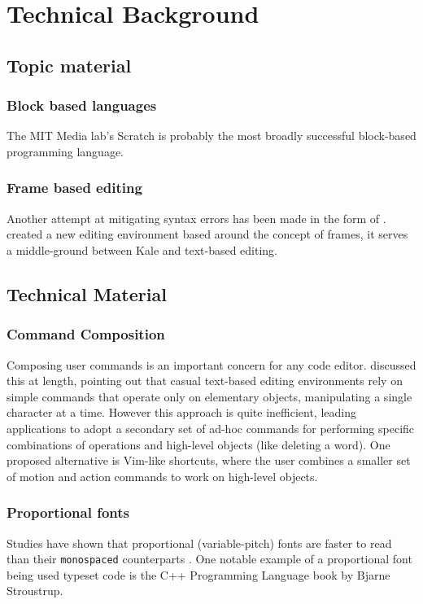 \chapter{Technical Background}

\section{Topic material}

\subsection{Block based languages}

The MIT Media lab's Scratch \citep{Maloney2010} is probably the most broadly
successful block-based programming language.

\subsection{Frame based editing}

Another attempt at mitigating syntax errors has been made in the form of
.  \citet{Kolling2017} created a new
editing environment based around the concept of frames, it serves a middle-ground
between Kale and text-based editing.

\section{Technical Material}

\subsection{Command Composition}
Composing user commands is an important concern for any code editor.
\citet{Chodarev2016} discussed this at length, pointing out that casual
text-based editing environments rely on simple commands that operate only on
elementary objects, manipulating a single character at a time. However this
approach is quite inefficient, leading applications to adopt a secondary set of
ad-hoc commands for performing specific combinations of operations and
high-level objects (like deleting a word). One proposed alternative is
Vim-like shortcuts, where the user combines a smaller set of motion and action
commands to work on high-level objects.

\subsection{Proportional fonts}
Studies have shown that
proportional (variable-pitch) fonts are
faster to read than their \texttt{monospaced} counterparts \citep{Campbell1981,
Beldie1983}. One notable example
of a proportional font being used typeset code is the C++ Programming Language
book by Bjarne Stroustrup.

